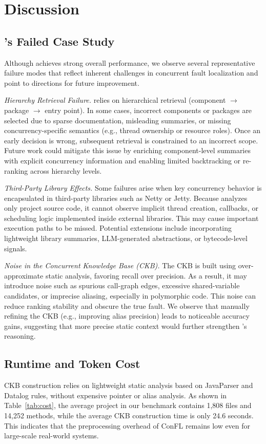 \section{Discussion}
\subsection{\Name{}’s Failed Case Study}

Although \Name{} achieves strong overall performance, we observe several representative failure modes that reflect inherent challenges in concurrent fault localization and point to directions for future improvement.

\noindent
\textit{Hierarchy Retrieval Failure.}
\Name{} relies on hierarchical retrieval (component $\rightarrow$ package $\rightarrow$ entry point).
In some cases, incorrect components or packages are selected due to sparse documentation, misleading summaries, or missing concurrency-specific semantics (e.g., thread ownership or resource roles).
Once an early decision is wrong, subsequent retrieval is constrained to an incorrect scope.
Future work could mitigate this issue by enriching component-level summaries with explicit concurrency information and enabling limited backtracking or re-ranking across hierarchy levels.

\noindent
\textit{Third-Party Library Effects.}
Some failures arise when key concurrency behavior is encapsulated in third-party libraries such as Netty or Jetty.
Because \Name{} analyzes only project source code, it cannot observe implicit thread creation, callbacks, or scheduling logic implemented inside external libraries.
This may cause important execution paths to be missed.
Potential extensions include incorporating lightweight library summaries, LLM-generated abstractions, or bytecode-level signals.

\noindent
\textit{Noise in the Concurrent Knowledge Base (CKB).}
The CKB is built using over-approximate static analysis, favoring recall over precision.
As a result, it may introduce noise such as spurious call-graph edges, excessive shared-variable candidates, or imprecise aliasing, especially in polymorphic code.
This noise can reduce ranking stability and obscure the true fault.
We observe that manually refining the CKB (e.g., improving alias precision) leads to noticeable accuracy gains, suggesting that more precise static context would further strengthen \Name{}’s reasoning.

\subsection{Runtime and Token Cost}
CKB construction relies on lightweight static analysis based on JavaParser and Datalog rules, without expensive pointer or alias analysis. As shown in Table~\ref{tab:cost}, the average project in our benchmark contains 1,808 files and 14,252 methods, while the average CKB construction time is only 24.6 seconds. This indicates that the preprocessing overhead of ConFL remains low even for large-scale real-world systems.

